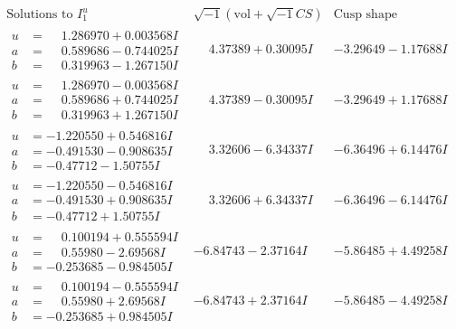 \documentclass[1p]{elsarticle_modified}
\theoremstyle{definition}
\newcommand{\I}{\sqrt{-1}}
\begin{document}
$$\begin{array}{c|c|c}  
\text{Solutions to }I^u_{1}& \I (\text{vol} + \sqrt{-1}CS) & \text{Cusp shape}\\
 \hline 
\begin{aligned}
u &= \phantom{-}1.286970 + 0.003568 I \\
a &= \phantom{-}0.589686 - 0.744025 I \\
b &= \phantom{-}0.319963 - 1.267150 I\end{aligned}
 & \phantom{-}4.37389 + 0.30095 I & -3.29649 - 1.17688 I \\ \hline\begin{aligned}
u &= \phantom{-}1.286970 - 0.003568 I \\
a &= \phantom{-}0.589686 + 0.744025 I \\
b &= \phantom{-}0.319963 + 1.267150 I\end{aligned}
 & \phantom{-}4.37389 - 0.30095 I & -3.29649 + 1.17688 I \\ \hline\begin{aligned}
u &= -1.220550 + 0.546816 I \\
a &= -0.491530 - 0.908635 I \\
b &= -0.47712 - 1.50755 I\end{aligned}
 & \phantom{-}3.32606 - 6.34337 I & -6.36496 + 6.14476 I \\ \hline\begin{aligned}
u &= -1.220550 - 0.546816 I \\
a &= -0.491530 + 0.908635 I \\
b &= -0.47712 + 1.50755 I\end{aligned}
 & \phantom{-}3.32606 + 6.34337 I & -6.36496 - 6.14476 I \\ \hline\begin{aligned}
u &= \phantom{-}0.100194 + 0.555594 I \\
a &= \phantom{-}0.55980 - 2.69568 I \\
b &= -0.253685 - 0.984505 I\end{aligned}
 & -6.84743 - 2.37164 I & -5.86485 + 4.49258 I \\ \hline\begin{aligned}
u &= \phantom{-}0.100194 - 0.555594 I \\
a &= \phantom{-}0.55980 + 2.69568 I \\
b &= -0.253685 + 0.984505 I\end{aligned}
 & -6.84743 + 2.37164 I & -5.86485 - 4.49258 I \\ \hline\begin{aligned}

\end{aligned}
\end{array}$$
\end{document}
